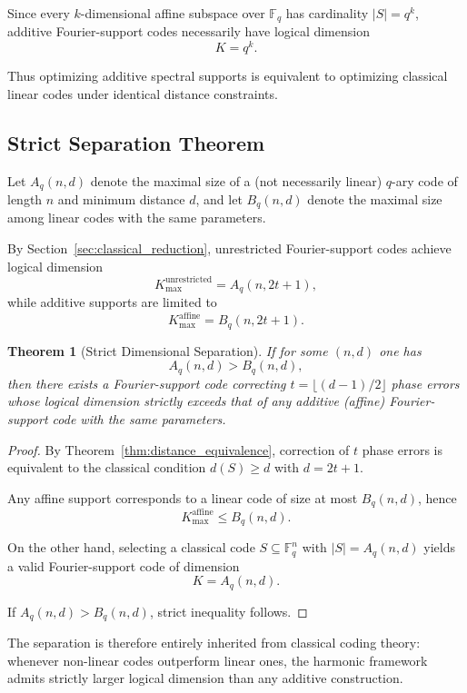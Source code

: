 \documentclass[a4paper,twocolumn,11pt,allowtoday]{quantumarticle}
\theoremstyle{plain}
\newtheorem{theorem}{Theorem}[section]
\theoremstyle{definition}
\theoremstyle{remark}
\begin{document}
Since every $k$-dimensional affine subspace over $\mathbb{F}_q$ has cardinality
$|S| = q^k$, additive Fourier-support codes necessarily have logical dimension
\[
K = q^k.
\]

Thus optimizing additive spectral supports is equivalent to optimizing
classical linear codes under identical distance constraints.

\subsection{Strict Separation Theorem}
\label{subsec:strict_separation}

Let $A_q(n,d)$ denote the maximal size of a (not necessarily linear)
$q$-ary code of length $n$ and minimum distance $d$, and let
$B_q(n,d)$ denote the maximal size among linear codes with the same
parameters.

By Section~\ref{sec:classical_reduction}, unrestricted Fourier-support
codes achieve logical dimension
\[
K_{\max}^{\mathrm{unrestricted}} = A_q(n,2t+1),
\]
while additive supports are limited to
\[
K_{\max}^{\mathrm{affine}} = B_q(n,2t+1).
\]

\begin{theorem}[Strict Dimensional Separation]
\label{thm:strict_separation}
If for some $(n,d)$ one has
\[
A_q(n,d) > B_q(n,d),
\]
then there exists a Fourier-support code correcting
$t = \lfloor (d-1)/2 \rfloor$ phase errors whose logical dimension
strictly exceeds that of any additive (affine) Fourier-support code
with the same parameters.
\end{theorem}

\begin{proof}
By Theorem~\ref{thm:distance_equivalence}, correction of $t$ phase errors
is equivalent to the classical condition $d(S)\ge d$ with $d=2t+1$.

Any affine support corresponds to a linear code of size at most
$B_q(n,d)$, hence
\[
K_{\max}^{\mathrm{affine}} \le B_q(n,d).
\]

On the other hand, selecting a classical code $S \subseteq \mathbb{F}_q^n$
with $|S|=A_q(n,d)$ yields a valid Fourier-support code of dimension
\[
K = A_q(n,d).
\]

If $A_q(n,d) > B_q(n,d)$, strict inequality follows.
\end{proof}

The separation is therefore entirely inherited from classical coding
theory: whenever non-linear codes outperform linear ones,
the harmonic framework admits strictly larger logical dimension
than any additive construction.
\end{document}
